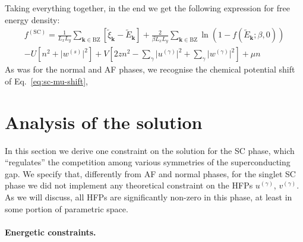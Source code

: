 \begin{tabproof}
	Taking everything together, in the end we get the following expression for free energy density:
	\begin{multline*}
		f^{(\mathrm{SC})} = \frac{1}{L_x L_y} \sum_{\mathbf{k} \in \mathrm{BZ}} \left[
			\tilde{\xi}_\mathbf{k} - \tilde{E}_\mathbf{k}
		\right] + \frac{2}{\beta L_x L_y} \sum_{\mathbf{k}\in\mathrm{BZ}} \ln \left(
			1- f( \tilde{E}_\mathbf{k}; \beta,0) 
		\right) \\
		-U \left[
			n^2 + \big|
				w^{(s)}
			\big|^2
		\right] + V \left[
			2zn^2 - \sum_\gamma \big|
				u^{(\gamma)}
			\big|^2 + \sum_\gamma \big|
				w^{(\gamma)}
			\big|^2
		\right] + \mu n
	\end{multline*}
	As was for the normal and AF phases, we recognise the chemical potential shift of Eq.~\eqref{eq:sc-mu-shift},
	

\end{tabproof}

\section{Analysis of the solution} \label{sec:sc-sceq-analysis}

In this section we derive one constraint on the solution for the SC phase, which ``regulates'' the competition among various symmetries of the superconducting gap. We specify that, differently from AF and normal phases, for the singlet SC phase we did not implement any theoretical constraint on the HFPs $u^{(\gamma)}$, $v^{(\gamma)}$. As we will discuss, all HFPs are significantly non-zero in this phase, at least in some portion of parametric space.

\paragraph{Energetic constraints.}

